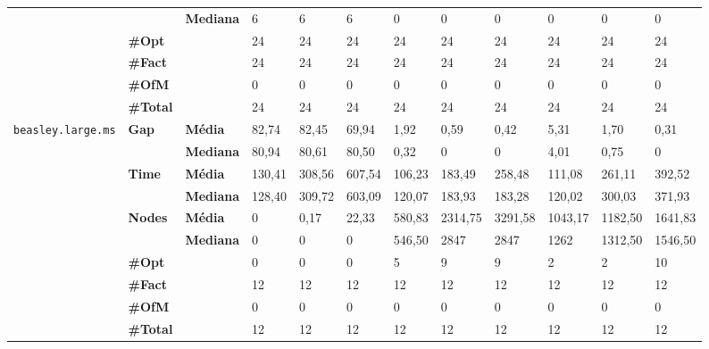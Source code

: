 \documentclass[]{article}
\begin{document}
\begin{table}[]
\begin{adjustbox}{angle=90}
\begin{tabular}{cll|lll|lll|lll}
& & \textbf{Mediana} & 6 & 6 & 6 & 0 & 0 & 0 & 0 & 0 & 0 \\
\cline{2-12}
& \textbf{\#Opt} & & 24 & 24 & 24 & 24 & 24 & 24 & 24 & 24 & 24 \\
& \textbf{\#Fact} & & 24 & 24 & 24 & 24 & 24 & 24 & 24 & 24 & 24 \\
& \textbf{\#OfM} & & 0 & 0 & 0 & 0 & 0 & 0 & 0 & 0 & 0 \\
& \textbf{\#Total} & & 24 & 24 & 24 & 24 & 24 & 24 & 24 & 24 & 24 \\
\hline
\multirow{7}{*}{\texttt{beasley.large.ms}} & \multirow{2}{*}{\textbf{Gap}} & \textbf{Média} & 82,74 & 82,45 & 69,94 & 1,92 & 0,59 & 0,42 & 5,31 & 1,70 & 0,31 \\
& & \textbf{Mediana} & 80,94 & 80,61 & 80,50 & 0,32 & 0 & 0 & 4,01 & 0,75 & 0 \\
\cline{2-12}
& \multirow{2}{*}{\textbf{Time}} & \textbf{Média} & 130,41 & 308,56 & 607,54 & 106,23 & 183,49 & 258,48 & 111,08 & 261,11 & 392,52 \\
& & \textbf{Mediana} & 128,40 & 309,72 & 603,09 & 120,07 & 183,93 & 183,28 & 120,02 & 300,03 & 371,93 \\
\cline{2-12}
& \multirow{2}{*}{\textbf{Nodes}} & \textbf{Média} & 0 & 0,17 & 22,33 & 580,83 & 2314,75 & 3291,58 & 1043,17 & 1182,50 & 1641,83 \\
& & \textbf{Mediana} & 0 & 0 & 0 & 546,50 & 2847 & 2847 & 1262 & 1312,50 & 1546,50 \\
\cline{2-12}
& \textbf{\#Opt} & & 0 & 0 & 0 & 5 & 9 & 9 & 2 & 2 & 10 \\
& \textbf{\#Fact} & & 12 & 12 & 12 & 12 & 12 & 12 & 12 & 12 & 12 \\
& \textbf{\#OfM} & & 0 & 0 & 0 & 0 & 0 & 0 & 0 & 0 & 0 \\
& \textbf{\#Total} & & 12 & 12 & 12 & 12 & 12 & 12 & 12 & 12 & 12 \\
\end{tabular}
\end{adjustbox}
\end{table}
\end{document}
